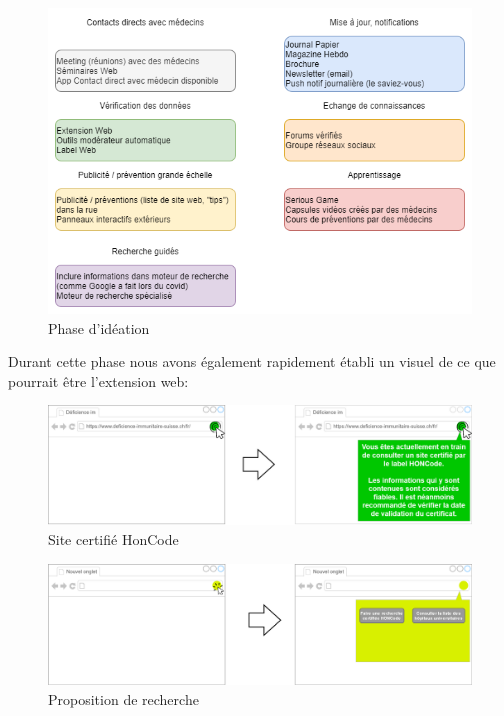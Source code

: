 \documentclass{ReportTemplate}
\begin{document}
\begin{figure}[H]
    \centering
    \includegraphics[width=\textwidth]{imageSources/Ideate_1.png}
    \caption{Phase d'idéation}
    \label{fig:Ideate1}
\end{figure}
\newpage
Durant cette phase nous avons également rapidement établi un visuel de ce que
pourrait être l'extension web:
\begin{figure}[H]
    \centering
    \includegraphics[width=\textwidth]{imageSources/Exemple_Extension_1.png}
    \caption{Site certifié HonCode}
    \label{fig:ExempleExt1}
\end{figure}
\begin{figure}[H]
    \centering
    \includegraphics[width=\textwidth]{imageSources/Exemple_Extension_2.png}
    \caption{Proposition de recherche}
    \label{fig:ExempleExt2}
\end{figure}
\end{document}
